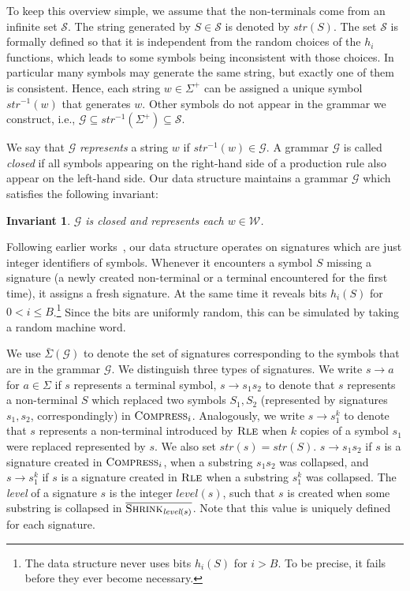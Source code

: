 \documentclass[a4paper]{article}
\newenvironment{shortv}{}{}
\newtheorem{invariant}[theorem]{Invariant}
\theoremstyle{remark}
\newcommand{\symbols}{\mathcal{S}}
\newcommand{\sigs}{\bar{\Sigma}}
\newcommand{\compress}{\textsc{Compress}}
\newcommand{\rle}{\textsc{Rle}}
\newcommand{\cshrink}[1]{\ensuremath{\overline{\textsc{Shrink}_{#1}}}}
\newcommand{\str}{w}
\newcommand{\hs}{h}
\newcommand{\grammar}{\mathcal{G}}
\newcommand{\mword}{B}
\newcommand{\spair}[3]{\ensuremath{#1 \rightarrow #2#3}}
\newcommand{\spower}[3]{\ensuremath{#1 \rightarrow #2^{#3}}}
\newcommand{\slev}{\textit{level}}
\newcommand{\sstr}{\textit{str}}
\newcommand{\coll}{\mathcal{W}}
\begin{document}
To keep this overview simple, we assume that the non-terminals come from an infinite set $\symbols$.
The string generated by $S\in\symbols$ is denoted by $\sstr(S)$.
The set $\symbols$ is formally defined so that it is independent from the random choices of the $h_i$ functions,
which leads to some symbols being inconsistent with those choices. 
In particular many symbols may generate the same string, but exactly one of them is consistent. 
Hence, each string $\str\in\Sigma^+$ can be assigned a unique symbol $\sstr^{-1}(\str)$ that generates $\str$.
Other symbols do not appear in the grammar we construct, i.e., $\grammar \subseteq \sstr^{-1}(\Sigma^+)\subseteq\symbols$.

We say that $\grammar$ \emph{represents} a string $w$ if $\sstr^{-1}(w) \in \grammar$.
A grammar $\grammar$ is called \emph{closed} if all symbols appearing on the right-hand side of a production rule
also appear on the left-hand side.
Our data structure maintains a grammar $\grammar$ which satisfies the following invariant:
\begin{invariant}\label{inv:consistency}
$\grammar$ is closed and represents each $w\in \coll$.
\end{invariant}


Following earlier works~\cite{Alstrup, Mehlhorn}, our data structure operates on signatures which are just integer identifiers of symbols.
Whenever it encounters a symbol $S$ missing a signature (a newly created non-terminal or a terminal encountered for the first time), it assigns a fresh signature.
At the same time it reveals bits $\hs_i(S)$ for $0< i \le \mword$.\footnote{The data structure never uses bits $\hs_i(S)$ for $i>\mword$. To be precise, it fails before they ever become necessary.}
Since the bits are uniformly random, this can be simulated by taking a random machine word.

We use $\sigs(\grammar)$ to denote the set of signatures corresponding to the symbols
that are in the grammar $\grammar$.
We distinguish three types of signatures.
We write $s\to a$ for $a\in \Sigma$ if $s$ represents a terminal symbol, $\spair{s}{s_1}{s_2}$ to denote that $s$ represents
a non-terminal $S$ which replaced two symbols $S_1,S_2$
(represented by signatures $s_1,s_2$, correspondingly)
in $\compress_{i}$.
Analogously, we write
$\spower{s}{s_1}{k}$ to denote that $s$ represents a non-terminal introduced by $\rle$ when
$k$ copies of a symbol $s_1$ were replaced represented by $s$.
We also set $\sstr(s)=\sstr(S)$.
\begin{shortv}
$\spair{s}{s_1}{s_2}$ if $s$ is a signature created in $\compress_{i}$, when a substring  $s_1s_2$ was collapsed,
and  $\spower{s}{s_1}{k}$ if $s$ is a signature created in $\rle$ when a substring $s_1^k$ was collapsed.
The \emph{level} of a signature $s$ is the integer $\slev(s)$, such that $s$ is created when some substring is collapsed in $\cshrink{\slev(s)}$.
Note that this value is uniquely defined for each signature.
\end{shortv}
\end{document}
